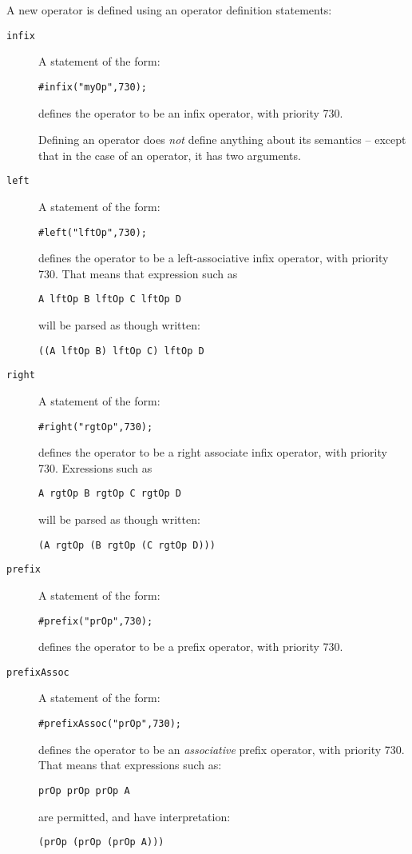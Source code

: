 A new operator is defined using an operator definition statements:
\begin{description}
\item[\tt infix]
A statement of the form:
\begin{lstlisting}
#infix("myOp",730);
\end{lstlisting}
defines the operator  to be an infix operator, with priority 730. 
\begin{aside}
Defining an operator does \emph{not} define anything about its semantics -- except that in the case of an  operator, it has two arguments.
\end{aside}
\item[\tt left]
A statement of the form:
\begin{lstlisting}
#left("lftOp",730);
\end{lstlisting}
defines the operator  to be a left-associative infix operator, with priority 730. That means that expression such as
\begin{lstlisting}
A lftOp B lftOp C lftOp D
\end{lstlisting}
will be parsed as though written:
\begin{lstlisting}
((A lftOp B) lftOp C) lftOp D
\end{lstlisting}

\item[\tt right]
A statement of the form:
\begin{lstlisting}
#right("rgtOp",730);
\end{lstlisting}
defines the operator  to be a right associate infix operator, with priority 730. Exressions such as
\begin{lstlisting}
A rgtOp B rgtOp C rgtOp D
\end{lstlisting}
will be parsed as though written:
\begin{lstlisting}
(A rgtOp (B rgtOp (C rgtOp D)))
\end{lstlisting}

\item[\tt prefix]
A statement of the form:
\begin{lstlisting}
#prefix("prOp",730);
\end{lstlisting}
defines the operator  to be a prefix operator, with priority 730. 

\item[\tt prefixAssoc]
A statement of the form:
\begin{lstlisting}
#prefixAssoc("prOp",730);
\end{lstlisting}
defines the operator  to be an \emph{associative} prefix operator, with priority 730. That means that expressions such as:
\begin{lstlisting}
prOp prOp prOp A
\end{lstlisting}
are permitted, and have interpretation:
\begin{lstlisting}
(prOp (prOp (prOp A)))
\end{lstlisting}


\end{description}

